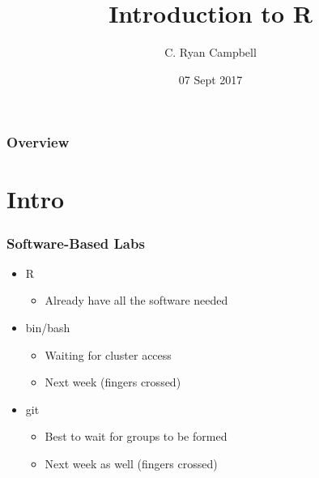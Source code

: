 \documentclass[14pt]{beamer}
\title[Intro to R]{Introduction to R} %
\author{C. Ryan Campbell} %
\institute[Duke] %
{
Duke University \\ %
\medskip
\textit{c.ryan.campbell@duke.edu} %
}
\date{07 Sept 2017} %
\begin{document}
\begin{frame}
\titlepage %
\end{frame}

\begin{frame}
\frametitle{Overview} %
\tableofcontents %
\end{frame}


\section{Intro} %

\begin{frame}
\frametitle{Software-Based Labs}
\begin{itemize}
	\item<+-> R
	\begin{itemize}
		\item Already have all the software needed
	\end{itemize}
	\item<+-> bin/bash
	\begin{itemize}
		\item Waiting for cluster access
		\item Next week (fingers crossed)
	\end{itemize}
	\item<+-> git
	\begin{itemize}
		\item Best to wait for groups to be formed
		\item Next week as well (fingers crossed)
	\end{itemize}
\end{itemize}
\end{frame}
\end{document}
